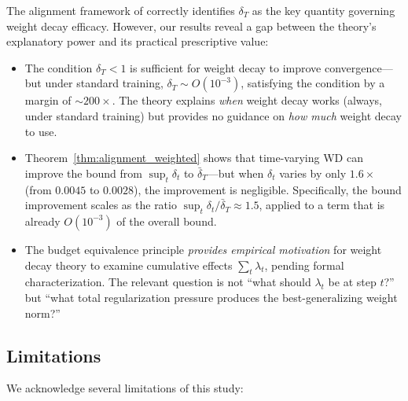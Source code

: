 \documentclass{article}
\begin{document}
The alignment framework of \citet{xie2024investigating} correctly identifies
$\delta_T$ as the key quantity governing weight decay efficacy.
However, our results reveal a gap between the theory's explanatory power and its
practical prescriptive value:
\begin{itemize}
  \item The condition $\delta_T < 1$ is sufficient for weight decay to improve
        convergence---but under standard training, $\delta_T \sim O(10^{-3})$,
        satisfying the condition by a margin of $\sim 200\times$.
        The theory explains \emph{when} weight decay works (always, under standard
        training) but provides no guidance on \emph{how much} weight decay to use.
  \item Theorem~\ref{thm:alignment_weighted} shows that time-varying WD can improve
        the bound from $\sup_t \delta_t$ to $\bar{\delta}_T$---but when $\delta_t$
        varies by only $1.6\times$ (from $0.0045$ to $0.0028$), the improvement is
        negligible.
        Specifically, the bound improvement scales as the ratio
        $\sup_t \delta_t / \bar{\delta}_T \approx 1.5$, applied to a term that is
        already $O(10^{-3})$ of the overall bound.
  \item The budget equivalence principle \emph{provides empirical motivation} for
        weight decay theory to examine cumulative effects $\sum_t \lambda_t$, pending
        formal characterization.
        The relevant question is not ``what should $\lambda_t$ be at step $t$?''
        but ``what total regularization pressure produces the best-generalizing
        weight norm?''
\end{itemize}

\subsection{Limitations}
\label{sec:limitations}

We acknowledge several limitations of this study:
\end{document}
